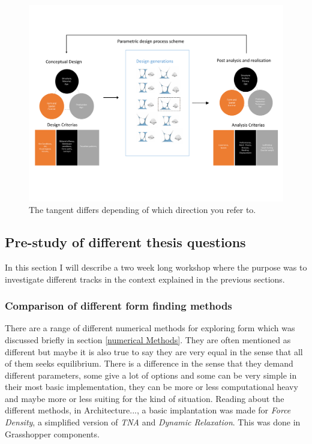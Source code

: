 \begin{figure}[H]
\centering
\includegraphics[width=1.0\linewidth ]{figure/Introduction/DesignScheme.pdf}
\caption{The tangent differs depending of which direction you refer to. }
\end{figure}

\subsection{Pre-study of different thesis questions}
In this section I will describe a two week long workshop where the purpose was to investigate different tracks in the context explained in the previous sections. 

\subsubsection{Comparison of different form finding methods} \label{CompMethods}
There are a range of different numerical methods for exploring form which was discussed briefly in section \ref{numerical Methods}. They are often mentioned as different but maybe it is also true to say they are very equal in the sense that all of them seeks equilibrium. There is a difference in the sense that they demand different parameters, some give a lot of options and some can be very simple in their most basic implementation, they can be more or less computational heavy and maybe more or less suiting for the kind of situation. 
Reading about the different methods, in Architecture..., a basic implantation was made for \textit{Force Density}, a simplified version of \textit{TNA} and \textit{Dynamic Relaxation}. This was done in Grasshopper components. 


